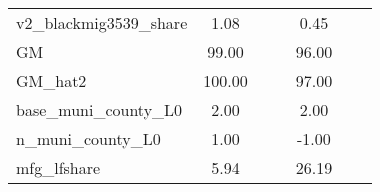 \begin{table}[htbp]
\begin{tabular}{l*{2}{ccc}}
v2\_blackmig3539\_share&        1.08&            &            &        0.45&            &            \\
GM                  &       99.00&            &            &       96.00&            &            \\
GM\_hat2             &      100.00&            &            &       97.00&            &            \\
base\_muni\_county\_L0 &        2.00&            &            &        2.00&            &            \\
n\_muni\_county\_L0    &        1.00&            &            &       -1.00&            &            \\
mfg\_lfshare         &        5.94&            &            &       26.19&            &            \\
\bottomrule
\end{tabular}
\end{table}
